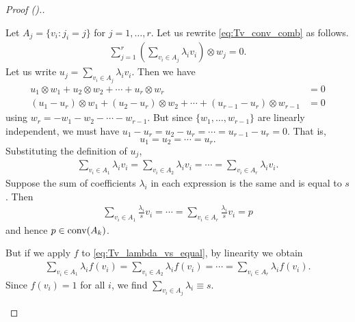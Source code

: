 \begin{proof}[Proof (\cite{sarkaria1992tverberg}).]
\begin{enumerate}
	Let $A_j = \{ v_i : j_i = j \}$ for $j=1,\dotsc,r$. Let us rewrite \cref{eq:Tv_conv_comb} as follows.
	\begin{align*}	
	\sum_{j=1}^r \left( \sum_{v_i \in A_j} \lambda_i v_i \right)\otimes w_j = 0.
	\end{align*}
	Let us write $u_j =  \sum_{v_i \in A_j} \lambda_i v_i$. Then we have
	\begin{align*}	
	u_1\otimes w_1 + u_2\otimes w_2 + \dotsm + u_r\otimes w_r &= 0\\
	(u_1- u_r)\otimes w_1 + (u_2-u_r)\otimes w_2 + \dotsm + (u_{r-1} - u_r)\otimes w_{r-1} &= 0
	\end{align*}
	using $w_r = -w_1 - w_2 - \dotsm - w_{r-1}$. But since $\{w_1,\dotsc,w_{r-1}\}$ are linearly independent, we must have $u_1-u_r = u_2 - u_r = \dotsm = u_{r-1}- u_r = 0$. That is, 
	\[
	u_1 = u_2 = \dotsm = u_r.
	\]
	Substituting the definition of $u_j$,
	\begin{align}	
	\sum_{v_i \in A_1} \lambda_i v_i = \sum_{v_i\in A_2} \lambda_i v_i = \dotsm = \sum_{v_i\in A_r}\lambda_i v_i. \label{eq:Tv_lambda_vs_equal}
	\end{align}
	Suppose the sum of coefficients $\lambda_i$ in each expression is the same and is equal to $s$. Then
	\begin{align*}	
	\sum_{v_i \in A_1} \frac{\lambda_i}{s}v_i = \dotsm = \sum_{v_i\in A_r} \frac{\lambda_i}{s}v_i = p
	\end{align*}
	and hence $p\in \operatorname{conv}(A_k)$.

	But if we apply $f$ to \cref{eq:Tv_lambda_vs_equal}, by linearity we obtain
	\begin{align*}	
	\sum_{v_i \in A_1} \lambda_i f(v_i) = \sum_{v_i\in A_2} \lambda_i f(v_i) = \dotsm = \sum_{v_i\in A_r}\lambda_i f(v_i). 
	\end{align*}
	Since $f(v_i)=1$ for all $i$, we find $\sum_{v_i\in A_j} \lambda_i \equiv s$. \qedhere
\end{enumerate}
\end{proof}

